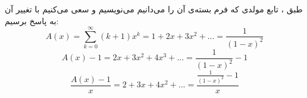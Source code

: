 \p
طبق
،
تابع مولدی که فرم بسته‌ی آن را می‌دانیم می‌نویسیم و سعی می‌کنیم با تغییر آن به پاسخ برسیم: 
    $$ A(x) = \sum\limits_{k=0}^{\infty}(k+1)x^k = 1 + 2x + 3x^2 + ... = \frac{1}{(1 - x)^2}$$ 
    $$ A(x) - 1 = 2x + 3x^2 + 4x^3 + ... = \frac{1}{(1 - x)^2} - 1$$
    $$ \frac{A(x) - 1}{x} = 2 + 3x + 4x^2 + ... = \frac{\frac{1}{(1 - x)^2} - 1}{x}$$
